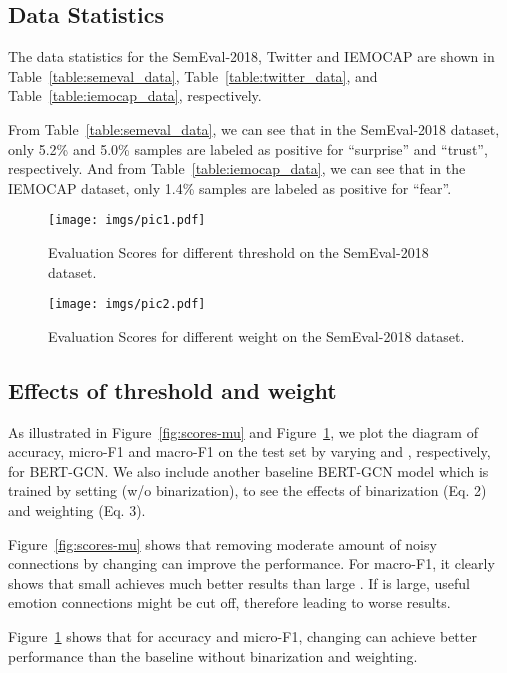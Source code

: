 \documentclass[11pt,a4paper]{article}
\begin{document}
\subsection{Data Statistics}
The data statistics for the SemEval-2018, Twitter and IEMOCAP are shown in Table~\ref{table:semeval_data}, Table~\ref{table:twitter_data}, and Table~\ref{table:iemocap_data}, respectively.

From Table~\ref{table:semeval_data}, we can see that in the SemEval-2018 dataset, only 5.2\% and 5.0\% samples are labeled as positive for ``surprise'' and ``trust'', respectively. And from Table~\ref{table:iemocap_data}, we can see that in the IEMOCAP dataset, only 1.4\% samples are labeled as positive for ``fear''.

\begin{figure}[t]
  \centering
\texttt{[image: imgs/pic1.pdf]}
  \caption{Evaluation Scores for different threshold  on the SemEval-2018 dataset.}
  \label{fig:scores-mu}
  \centering
\texttt{[image: imgs/pic2.pdf]}  
  \caption{Evaluation Scores for different weight  on the SemEval-2018 dataset.}
  \label{fig:scores-w}
\end{figure}

\subsection{Effects of threshold  and weight }
As illustrated in Figure~\ref{fig:scores-mu} and Figure~\ref{fig:scores-w}, we plot the diagram of accuracy, micro-F1 and macro-F1 on the test set by varying  and , respectively, for BERT-GCN. We also include another baseline BERT-GCN model which is trained by setting  (w/o binarization), to see the effects of binarization (Eq. 2) and weighting (Eq. 3). 

Figure~\ref{fig:scores-mu} shows that removing moderate amount of noisy connections by changing  can improve the performance. For macro-F1, it clearly shows that small  achieves much better results than large . If  is large, useful emotion connections might be cut off, therefore leading to worse results.

Figure~\ref{fig:scores-w} shows that for accuracy and micro-F1, changing  can achieve better performance than the baseline without binarization and weighting.
\end{document}
